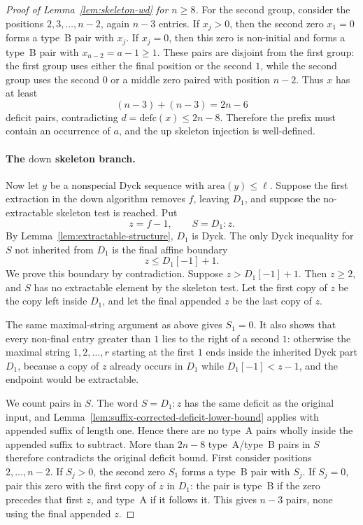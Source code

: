 \documentclass[11pt]{article}
\theoremstyle{plain}
\theoremstyle{definition}
\theoremstyle{remark}
\newcommand{\area}{\mathrm{area}}
\newcommand{\defc}{\mathrm{defc}}
\begin{document}
\begin{proof}[Proof of Lemma~\ref{lem:skeleton-wd} for \(n\ge 8\)]
For the second group, consider the positions \(2,3,\ldots,n-2\), again
\(n-3\) entries.  If \(x_j>0\), then the second zero \(x_1=0\) forms a
type~B pair with \(x_j\).  If \(x_j=0\), then this zero is non-initial and
forms a type~B pair with \(x_{n-2}=a-1\ge1\).  These pairs are disjoint from
the first group: the first group uses either the final position or the second
\(1\), while the second group uses the second \(0\) or a middle zero paired
with position \(n-2\).  Thus \(x\) has at least
\[
  (n-3)+(n-3)=2n-6
\]
deficit pairs, contradicting \(d=\defc(x)\le2n-8\).
Therefore the prefix must contain an occurrence of \(a\), and the \(\mathrm{up}\)
skeleton injection is well-defined.
\paragraph{The \(\mathrm{down}\) skeleton branch.}
Now let \(y\) be a nonspecial Dyck sequence with \(\area(y)\le\ell\).  Suppose
the first extraction in the \(\mathrm{down}\) algorithm removes \(f\), leaving
\(D_1\), and suppose the no-extractable skeleton test is reached.  Put
\[
  z=f-1,\qquad S=D_1:z .
\]
By Lemma~\ref{lem:extractable-structure}, \(D_1\) is Dyck.  The only Dyck
inequality for \(S\) not inherited from \(D_1\) is the final affine boundary
\[
  z\le D_1[-1]+1.
\]
We prove this boundary by contradiction.  Suppose \(z>D_1[-1]+1\).  Then
\(z\ge2\), and \(S\) has no extractable element by the skeleton test.  Let the
first copy of \(z\) be the copy left inside \(D_1\), and let the final appended
\(z\) be the last copy of \(z\).

The same maximal-string argument as above gives \(S_1=0\).  It also shows that
every non-final entry greater than \(1\) lies to the right of a second \(1\):
otherwise the maximal string \(1,2,\ldots,r\) starting at the first \(1\) ends
inside the inherited Dyck part \(D_1\), because a copy of \(z\) already occurs
in \(D_1\) while \(D_1[-1]<z-1\), and the endpoint would be extractable.

We count pairs in \(S\).  The word \(S=D_1:z\) has the same deficit
as the original input, and Lemma~\ref{lem:suffix-corrected-deficit-lower-bound}
applies with appended suffix of length one.  Hence there are no type~A pairs
wholly inside the appended suffix to subtract.  More than \(2n-8\)
type~A/type~B pairs in \(S\) therefore contradicts the original deficit bound.
First
consider positions \(2,\ldots,n-2\).  If \(S_j>0\), the second zero \(S_1\)
forms a type~B pair with \(S_j\).  If \(S_j=0\), pair this zero with the first
copy of \(z\) in \(D_1\): the pair is type~B if the zero precedes that first
\(z\), and type~A if it follows it.  This gives \(n-3\) pairs, none using the
final appended \(z\).


\end{proof}
\end{document}
